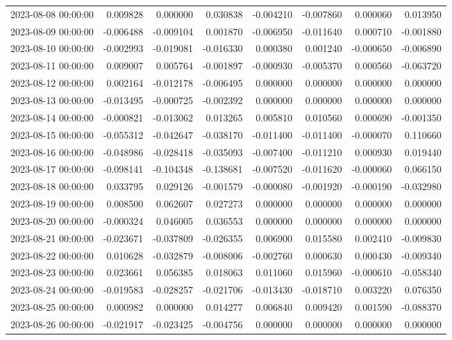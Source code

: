 \begin{tabular}{lrrrrrrr}
2023-08-08 00:00:00 & 0.009828 & 0.000000 & 0.030838 & -0.004210 & -0.007860 & 0.000060 & 0.013950 \\
2023-08-09 00:00:00 & -0.006488 & -0.009104 & 0.001870 & -0.006950 & -0.011640 & 0.000710 & -0.001880 \\
2023-08-10 00:00:00 & -0.002993 & -0.019081 & -0.016330 & 0.000380 & 0.001240 & -0.000650 & -0.006890 \\
2023-08-11 00:00:00 & 0.009007 & 0.005764 & -0.001897 & -0.000930 & -0.005370 & 0.000560 & -0.063720 \\
2023-08-12 00:00:00 & 0.002164 & -0.012178 & -0.006495 & 0.000000 & 0.000000 & 0.000000 & 0.000000 \\
2023-08-13 00:00:00 & -0.013495 & -0.000725 & -0.002392 & 0.000000 & 0.000000 & 0.000000 & 0.000000 \\
2023-08-14 00:00:00 & -0.000821 & -0.013062 & 0.013265 & 0.005810 & 0.010560 & 0.000690 & -0.001350 \\
2023-08-15 00:00:00 & -0.055312 & -0.042647 & -0.038170 & -0.011400 & -0.011400 & -0.000070 & 0.110660 \\
2023-08-16 00:00:00 & -0.048986 & -0.028418 & -0.035093 & -0.007400 & -0.011210 & 0.000930 & 0.019440 \\
2023-08-17 00:00:00 & -0.098141 & -0.104348 & -0.138681 & -0.007520 & -0.011620 & -0.000060 & 0.066150 \\
2023-08-18 00:00:00 & 0.033795 & 0.029126 & -0.001579 & -0.000080 & -0.001920 & -0.000190 & -0.032980 \\
2023-08-19 00:00:00 & 0.008500 & 0.062607 & 0.027273 & 0.000000 & 0.000000 & 0.000000 & 0.000000 \\
2023-08-20 00:00:00 & -0.000324 & 0.046005 & 0.036553 & 0.000000 & 0.000000 & 0.000000 & 0.000000 \\
2023-08-21 00:00:00 & -0.023671 & -0.037809 & -0.026355 & 0.006900 & 0.015580 & 0.002410 & -0.009830 \\
2023-08-22 00:00:00 & 0.010628 & -0.032879 & -0.008006 & -0.002760 & 0.000630 & 0.000430 & -0.009340 \\
2023-08-23 00:00:00 & 0.023661 & 0.056385 & 0.018063 & 0.011060 & 0.015960 & -0.000610 & -0.058340 \\
2023-08-24 00:00:00 & -0.019583 & -0.028257 & -0.021706 & -0.013430 & -0.018710 & 0.003220 & 0.076350 \\
2023-08-25 00:00:00 & 0.000982 & 0.000000 & 0.014277 & 0.006840 & 0.009420 & 0.001590 & -0.088370 \\
2023-08-26 00:00:00 & -0.021917 & -0.023425 & -0.004756 & 0.000000 & 0.000000 & 0.000000 & 0.000000 \\

\end{tabular}
